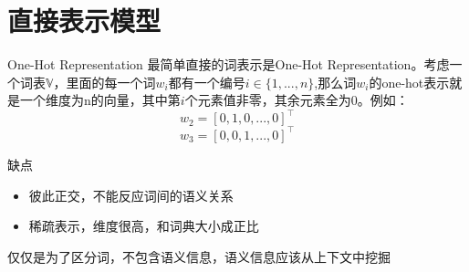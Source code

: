 \documentclass[10pt,aspectratio=43,mathserif,table]{beamer}
\begin{document}
\section{直接表示模型}
\begin{frame}{One-Hot Representation}
最简单直接的词表示是One-Hot Representation。考虑一个词表$ \mathbb V $，里面的每一个词$ w_i $都有一个编号$ i\in \{1,...,n\} $,那么词$ w_i $的one-hot表示就是一个维度为n的向量，其中第$ i $个元素值非零，其余元素全为0。例如：
\[  w_2=[0,1,0,...,0]^\top  \]
\[  w_3=[0,0,1,...,0]^\top  \]
\begin{block}{缺点}
	\begin{itemize}
		\item<0-> 彼此正交，不能反应词间的语义关系
		\item<0-> 稀疏表示，维度很高，和词典大小成正比
	\end{itemize}
\end{block}
\begin{center}
	\textcolor{mymauve}{仅仅是为了区分词，不包含语义信息，语义信息应该从上下文中挖掘}
\end{center}
\end{frame}
\end{document}
